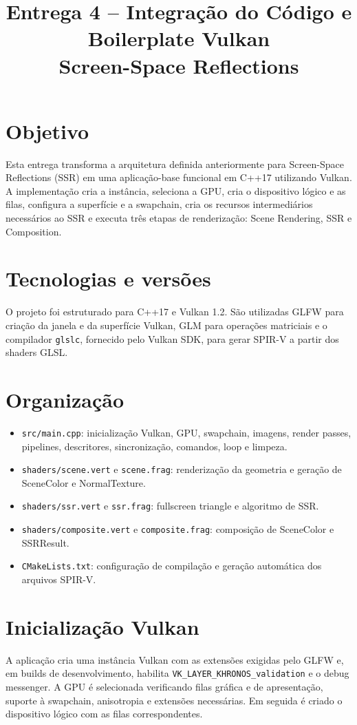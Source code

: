 \documentclass[12pt,a4paper]{article}
\title{Entrega 4 -- Integração do Código e Boilerplate Vulkan\\Screen-Space Reflections}
\author{}
\date{}
\begin{document}
\maketitle

\section{Objetivo}
Esta entrega transforma a arquitetura definida anteriormente para Screen-Space Reflections (SSR) em uma aplicação-base funcional em C++17 utilizando Vulkan. A implementação cria a instância, seleciona a GPU, cria o dispositivo lógico e as filas, configura a superfície e a swapchain, cria os recursos intermediários necessários ao SSR e executa três etapas de renderização: Scene Rendering, SSR e Composition.

\section{Tecnologias e versões}
O projeto foi estruturado para C++17 e Vulkan 1.2. São utilizadas GLFW para criação da janela e da superfície Vulkan, GLM para operações matriciais e o compilador \texttt{glslc}, fornecido pelo Vulkan SDK, para gerar SPIR-V a partir dos shaders GLSL.

\section{Organização}
\begin{itemize}
\item \texttt{src/main.cpp}: inicialização Vulkan, GPU, swapchain, imagens, render passes, pipelines, descritores, sincronização, comandos, loop e limpeza.
\item \texttt{shaders/scene.vert} e \texttt{scene.frag}: renderização da geometria e geração de SceneColor e NormalTexture.
\item \texttt{shaders/ssr.vert} e \texttt{ssr.frag}: fullscreen triangle e algoritmo de SSR.
\item \texttt{shaders/composite.vert} e \texttt{composite.frag}: composição de SceneColor e SSRResult.
\item \texttt{CMakeLists.txt}: configuração de compilação e geração automática dos arquivos SPIR-V.
\end{itemize}

\section{Inicialização Vulkan}
A aplicação cria uma instância Vulkan com as extensões exigidas pelo GLFW e, em builds de desenvolvimento, habilita \texttt{VK\_LAYER\_KHRONOS\_validation} e o debug messenger. A GPU é selecionada verificando filas gráfica e de apresentação, suporte à swapchain, anisotropia e extensões necessárias. Em seguida é criado o dispositivo lógico com as filas correspondentes.
\end{document}

